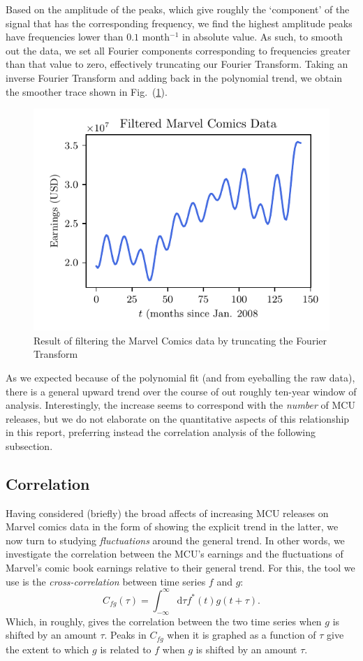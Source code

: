 \documentclass[12pt]{article}
\renewcommand{\d}{\mathrm d}
\begin{document}
Based on the amplitude of the peaks, which give roughly the `component' of the signal that has the corresponding frequency, we find the highest amplitude peaks have frequencies lower than $0.1$ month$^{-1}$ in absolute value.  As such, to smooth out the data, we set all Fourier components corresponding to frequencies greater than that value to zero, effectively truncating our Fourier Transform.  Taking an inverse Fourier Transform and adding back in the polynomial trend, we obtain the smoother trace shown in Fig.~(\ref{fig:filtered}).
\begin{figure}[h]
    \centering
    \includegraphics{figures/filtered.pdf}
    \caption{Result of filtering the Marvel Comics data by truncating the Fourier Transform}\label{fig:filtered}
\end{figure}
As we expected because of the polynomial fit (and from eyeballing the raw data), there is a general upward trend over the course of out roughly ten-year window of analysis.  Interestingly, the increase seems to correspond with the \textit{number} of MCU releases, but we do not elaborate on the quantitative aspects of this relationship in this report, preferring instead the correlation analysis of the following subsection.


\subsection{Correlation}
\label{sec:correlation}
Having considered (briefly) the broad affects of increasing MCU releases on Marvel comics data in the form of showing the explicit trend in the latter, we now turn to studying \textit{fluctuations} around the general trend. In other words, we investigate the correlation between the MCU's earnings and the fluctuations of Marvel's comic book earnings relative to their general trend.  For this, the tool we use is the \textit{cross-correlation} between time series $f$ and $g$:
\begin{equation}
    C_{fg}(\tau) = \int_{-\infty}^\infty \d \tau f^*(t)g(t+\tau).
\end{equation}
Which, in roughly, gives the correlation between the two time series when $g$ is shifted by an amount $\tau$.  Peaks in $C_{fg}$ when it is graphed as a function of $\tau$ give the extent to which $g$ is related to $f$ when $g$ is shifted by an amount $\tau$.
\end{document}
